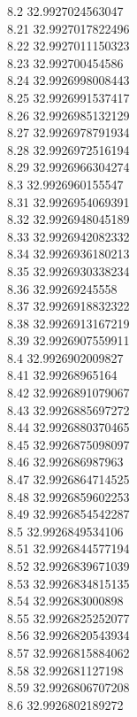 {8.2	32.9927024563047\\
8.21	32.9927017822496\\
8.22	32.9927011150323\\
8.23	32.992700454586\\
8.24	32.9926998008443\\
8.25	32.9926991537417\\
8.26	32.9926985132129\\
8.27	32.9926978791934\\
8.28	32.9926972516194\\
8.29	32.9926966304274\\
8.3	32.9926960155547\\
8.31	32.9926954069391\\
8.32	32.9926948045189\\
8.33	32.9926942082332\\
8.34	32.9926936180213\\
8.35	32.9926930338234\\
8.36	32.99269245558\\
8.37	32.9926918832322\\
8.38	32.9926913167219\\
8.39	32.9926907559911\\
8.4	32.9926902009827\\
8.41	32.99268965164\\
8.42	32.9926891079067\\
8.43	32.9926885697272\\
8.44	32.9926880370465\\
8.45	32.9926875098097\\
8.46	32.992686987963\\
8.47	32.9926864714525\\
8.48	32.9926859602253\\
8.49	32.9926854542287\\
8.5	32.9926849534106\\
8.51	32.9926844577194\\
8.52	32.9926839671039\\
8.53	32.9926834815135\\
8.54	32.992683000898\\
8.55	32.9926825252077\\
8.56	32.9926820543934\\
8.57	32.9926815884062\\
8.58	32.992681127198\\
8.59	32.9926806707208\\
8.6	32.9926802189272\\
}
